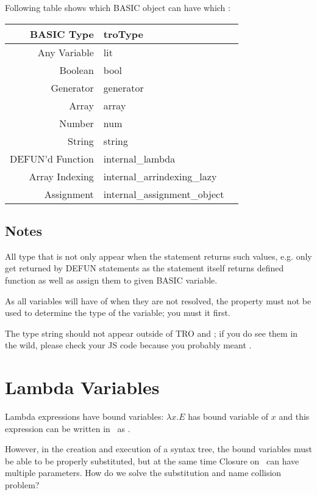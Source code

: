 Following table shows which BASIC object can have which :

\begin{tabulary}{\textwidth}{RLL}
BASIC Type & troType \\
\hline
Any Variable & {\ttfamily lit} \\
Boolean & {\ttfamily bool} \\
Generator & {\ttfamily generator} \\
Array & {\ttfamily array} \\
Number & {\ttfamily num} \\
String & {\ttfamily string} \\
DEFUN'd Function & {\ttfamily internal\_lambda} \\
Array Indexing & {\ttfamily internal\_arrindexing\_lazy} \\
Assignment & {\ttfamily internal\_assignment\_object} \\
\end{tabulary}

\subsection*{Notes}
\begin{itemlist}
\item All type that is not  only appear when the statement returns such values, e.g.  only get returned by DEFUN statements as the statement itself returns defined function as well as assign them to given BASIC variable.
\item As all variables will have  of  when they are not resolved, the property must not be used to determine the type of the variable; you must  it first.
\item The type string  should not appear outside of TRO and ; if you do see them in the wild, please check your JS code because you probably meant .
\end{itemlist}

\section{Lambda Variables}

Lambda expressions have bound variables: $\lambda x . E$ has bound variable of $x$ and this expression can be written in \tbas\ as .

However, in the creation and execution of a syntax tree, the bound variables must be able to be properly substituted, but at the same time Closure on \tbas\ can have multiple parameters. How do we solve the substitution and name collision problem?

